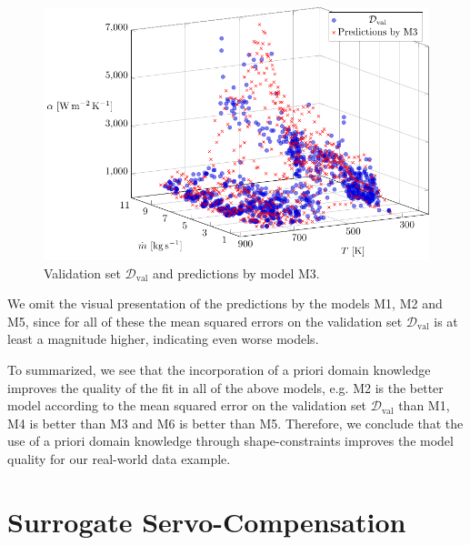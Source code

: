 \begin{figure}[H]
	\centering
	\includegraphics[width=\columnwidth]{graphics/pgfplots/cha5/Ebner/M3.pdf}
	\caption{Validation set $\mathcal{D}_{\text{val}}$ and predictions by model M3.}
	\label{fig:ebner-M3}
\end{figure}

We omit the visual presentation of the predictions by the models M1, M2 and M5, since for all of these the mean squared errors on the validation set $\mathcal{D}_{\text{val}}$ is at least a magnitude higher, indicating even worse models.

To summarized, we see that the incorporation of a priori domain knowledge improves the quality of the fit in all of the above models, e.g. M2 is the better model according to the mean squared error on the validation set $\mathcal{D}_{\text{val}}$ than M1, M4 is better than M3 and M6 is better than M5. Therefore, we conclude that the use of a priori domain knowledge through shape-constraints improves the model quality for our real-world data example. 

\section{Surrogate Servo-Compensation} \label{sec:real-world-application2}

